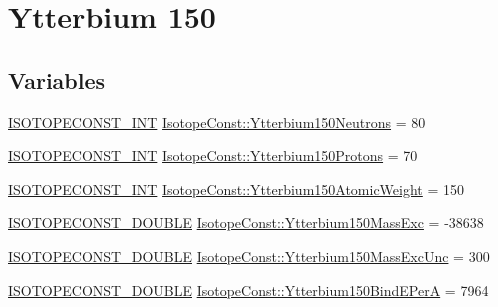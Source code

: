 \hypertarget{group___isotope_const-_ytterbium-_yb150}{}\section{Ytterbium 150}
\label{group___isotope_const-_ytterbium-_yb150}
\subsection*{Variables}
\begin{DoxyCompactItemize}
\item 
\mbox{\hyperlink{group___isotope_const-_macros_ga5f18360b3e99483a35c32d789e62621c}{I\+S\+O\+T\+O\+P\+E\+C\+O\+N\+S\+T\+\_\+\+I\+NT}} \mbox{\hyperlink{group___isotope_const-_ytterbium-_yb150_ga5eef4fe7fe870a9bf9ad673d20f9834d}{Isotope\+Const\+::\+Ytterbium150\+Neutrons}} = 80
\item 
\mbox{\hyperlink{group___isotope_const-_macros_ga5f18360b3e99483a35c32d789e62621c}{I\+S\+O\+T\+O\+P\+E\+C\+O\+N\+S\+T\+\_\+\+I\+NT}} \mbox{\hyperlink{group___isotope_const-_ytterbium-_yb150_ga998dfc30c61f6394bbceb9853099d770}{Isotope\+Const\+::\+Ytterbium150\+Protons}} = 70
\item 
\mbox{\hyperlink{group___isotope_const-_macros_ga5f18360b3e99483a35c32d789e62621c}{I\+S\+O\+T\+O\+P\+E\+C\+O\+N\+S\+T\+\_\+\+I\+NT}} \mbox{\hyperlink{group___isotope_const-_ytterbium-_yb150_ga697859870933903991aa1936297284d6}{Isotope\+Const\+::\+Ytterbium150\+Atomic\+Weight}} = 150
\item 
\mbox{\hyperlink{group___isotope_const-_macros_ga8f45a7272ce02c0b4c65c44636ed719a}{I\+S\+O\+T\+O\+P\+E\+C\+O\+N\+S\+T\+\_\+\+D\+O\+U\+B\+LE}} \mbox{\hyperlink{group___isotope_const-_ytterbium-_yb150_ga06f54392c2b3b385f5cfcc57ecbf0f6c}{Isotope\+Const\+::\+Ytterbium150\+Mass\+Exc}} = -\/38638
\item 
\mbox{\hyperlink{group___isotope_const-_macros_ga8f45a7272ce02c0b4c65c44636ed719a}{I\+S\+O\+T\+O\+P\+E\+C\+O\+N\+S\+T\+\_\+\+D\+O\+U\+B\+LE}} \mbox{\hyperlink{group___isotope_const-_ytterbium-_yb150_gafcd26999de8bec5dfbbc41c7b0c7c8d4}{Isotope\+Const\+::\+Ytterbium150\+Mass\+Exc\+Unc}} = 300
\item 
\mbox{\hyperlink{group___isotope_const-_macros_ga8f45a7272ce02c0b4c65c44636ed719a}{I\+S\+O\+T\+O\+P\+E\+C\+O\+N\+S\+T\+\_\+\+D\+O\+U\+B\+LE}} \mbox{\hyperlink{group___isotope_const-_ytterbium-_yb150_ga02851409a70b1a7097da8ea604185a90}{Isotope\+Const\+::\+Ytterbium150\+Bind\+E\+PerA}} = 7964
\item 

\end{DoxyCompactItemize}
